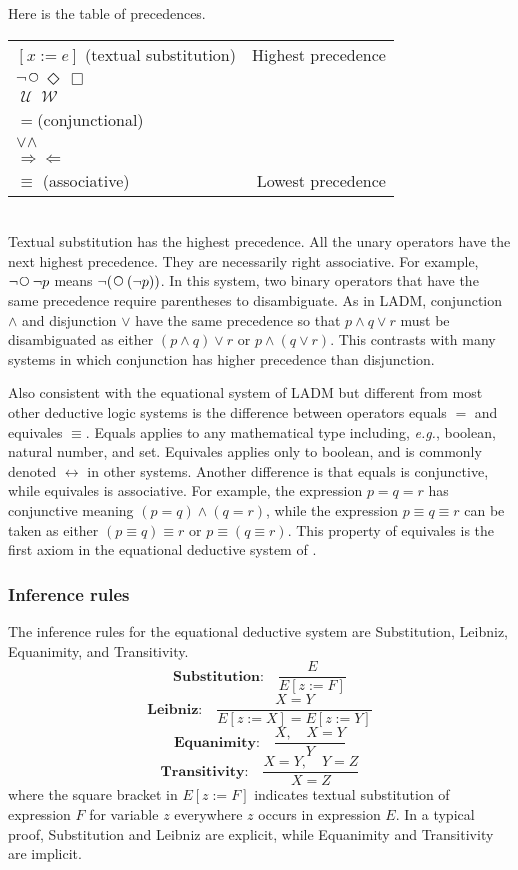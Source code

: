 \documentclass[12pt, fleqn, leqno]{article}
\newcommand{\lllgap}{12pt}                          %
\newcommand{\impl}{\ensuremath{\Rightarrow}}        %
\newcommand{\foll}{\ensuremath{\Leftarrow}}         %
\newcommand{\Until}{\;\mathcal{U}\;}
\newcommand{\Wait}{\;\mathcal{W}\;}
\newcommand{\Next}{\;\,\text{\raisebox{3.5pt}{\circle{6}}}}
\newcommand{\Event}{\Diamond\,}
\newcommand{\Always}{\Box\,}
\begin{document}
Here is the table of precedences.\\[\lllgap]
\setlength\extrarowheight{2pt}
\begin{tabular}{lr}
\hline
$[x := e]$ (textual substitution) & Highest precedence\\
$\neg$\quad $\Next$\quad $\Event$\quad $\Always$ &\\
$\Until$\quad $\Wait$ &\\
$=$\quad (conjunctional) &\\
$\lor$\quad $\land$ &\\
$\impl$\quad $\foll$ &\\
$\equiv$ \quad (associative) & Lowest precedence\\
\hline
\end{tabular}\\[\lllgap]
Textual substitution has the highest precedence.
All the unary operators have the next highest precedence.
They are necessarily right associative.
For example, $\neg \Next \neg p$ means $\neg (\Next (\neg p))$.
In this system, two binary operators that have the same precedence require parentheses to disambiguate.
As in LADM, conjunction $\land$ and disjunction $\lor$ have the same precedence so that $p\land q\lor r$
must be disambiguated as either $(p\land q)\lor r$ or $p\land (q\lor r)$.
This contrasts with many systems in which conjunction has higher precedence than disjunction.

Also consistent with the equational system of LADM but different from most other deductive logic systems
is the difference between operators equals $=$ and equivales $\equiv$.
Equals applies to any mathematical type including, {\itshape e.g.\/}, boolean, natural number, and set.
Equivales applies only to boolean, and is commonly denoted $\leftrightarrow$ in other systems.
Another difference is that equals is conjunctive, while equivales is associative.
For example, the expression $p = q = r$ has conjunctive meaning $(p = q) \land (q = r)$, while the expression $p \equiv q \equiv r$
can be taken as either $(p \equiv q) \equiv r$ or $p \equiv (q \equiv r)$.
This property of equivales is the first axiom in the equational deductive system of \cite{LADM}.

\subsubsection*{Inference rules}

The inference rules for the equational deductive system are Substitution, Leibniz, Equanimity, and Transitivity.
\[
\textbf{Substitution:}\quad \frac{E}{E[z:=F]}
\]
\[
\textbf{Leibniz:}\quad \frac{X=Y}{E[z:=X]=E[z:=Y]}
\]
\[
\textbf{Equanimity:}\quad \frac{X, \quad X=Y}{Y}
\]
\[
\textbf{Transitivity:}\quad \frac{X=Y, \quad Y=Z}{X=Z}
\]
where the square bracket in $E[z:=F]$ indicates textual substitution of expression $F$ for variable $z$
everywhere $z$ occurs in expression $E$.
In a typical proof, Substitution and Leibniz are explicit, while Equanimity and Transitivity are implicit.
\end{document}
